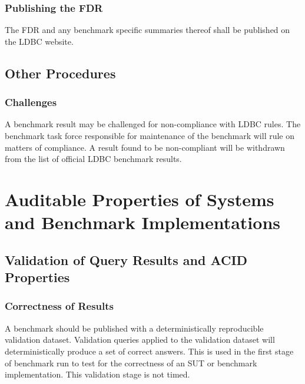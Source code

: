 \subsubsection{Publishing the FDR}
The FDR and any benchmark specific summaries thereof shall be published on the LDBC website.

\subsection{Other Procedures}

\subsubsection{Challenges}
A benchmark result may be challenged for non-compliance with LDBC rules. The benchmark task force responsible for maintenance of the benchmark will rule on matters of compliance. A result found to be non-compliant will be withdrawn from the list of official LDBC benchmark results.


\section{Auditable Properties of Systems and Benchmark Implementations}


\subsection{Validation of Query Results and ACID Properties}

\subsubsection{Correctness of Results}

A benchmark should be published with a deterministically reproducible validation dataset. Validation queries applied to the validation dataset will deterministically produce a set of correct answers. This is used in the first stage of benchmark run to test for the correctness of an SUT or benchmark implementation. This validation stage is not timed.
                          
